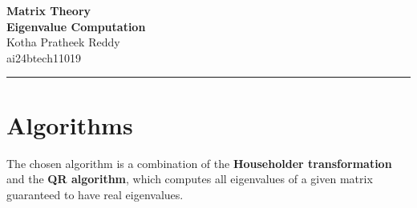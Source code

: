 \documentclass[12pt,letterpaper,onecolumn]{exam}
\begin{document}
\begingroup
    \centering
    \LARGE \textbf{Matrix Theory}\\
    \LARGE \textbf{Eigenvalue Computation}\\[0.5em]
    
    \large Kotha Pratheek Reddy\\
    \large ai24btech11019\par
\endgroup

\rule{\textwidth}{0.4pt}

\pointsdroppedatright %
\printanswers
\renewcommand{\solutiontitle}{\noindent\textbf{Answer:}\enspace} %

\section{Algorithms}
The chosen algorithm is a combination of the \textbf{Householder transformation} and the \textbf{QR algorithm}, which computes all eigenvalues of a given matrix guaranteed to have real eigenvalues.
\end{document}
